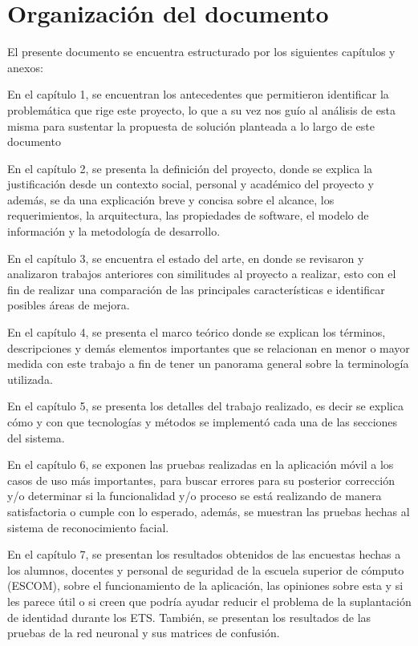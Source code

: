 

\section*{Organización del documento}

El presente documento se encuentra estructurado por los siguientes capítulos y anexos:

En el capítulo 1, se encuentran los antecedentes que permitieron identificar la problemática que rige este proyecto, lo que a su vez nos guío al análisis de esta misma para sustentar la propuesta de solución planteada a lo largo de este documento

En el capítulo 2, se presenta la definición del proyecto, donde se explica la justificación desde un contexto social, personal y académico del proyecto y además, se da una explicación breve y concisa sobre el alcance, los requerimientos, la arquitectura, las propiedades de software, el modelo de información y la metodología de desarrollo.

En el capítulo 3, se encuentra el estado del arte, en donde se revisaron y analizaron trabajos anteriores con similitudes al proyecto a realizar, esto con el fin de realizar una comparación de las principales características e identificar posibles áreas de mejora.

En el capítulo 4, se presenta el marco teórico donde se explican los términos, descripciones y demás elementos importantes que se relacionan en menor o mayor medida con este trabajo a fin de tener un panorama general sobre la terminología utilizada.

En el capítulo 5, se presenta los detalles del trabajo realizado, es decir se explica cómo y con que tecnologías y métodos se implementó cada una de las secciones del sistema.

En el capítulo 6, se exponen las pruebas realizadas en la aplicación móvil a los casos de uso más importantes, para buscar errores para su posterior corrección y/o determinar si la funcionalidad y/o proceso se está realizando de manera satisfactoria o cumple con lo esperado, además, se muestran las pruebas hechas al sistema de reconocimiento facial.

En el capítulo 7, se presentan los resultados obtenidos de las encuestas hechas a los alumnos, docentes y personal de seguridad de la escuela superior de cómputo (ESCOM), sobre el funcionamiento de la aplicación, las opiniones sobre esta y si les parece útil o si creen que podría ayudar reducir el problema de la suplantación de identidad durante los ETS. También, se presentan los resultados de las pruebas de la red neuronal y sus matrices de confusión.

